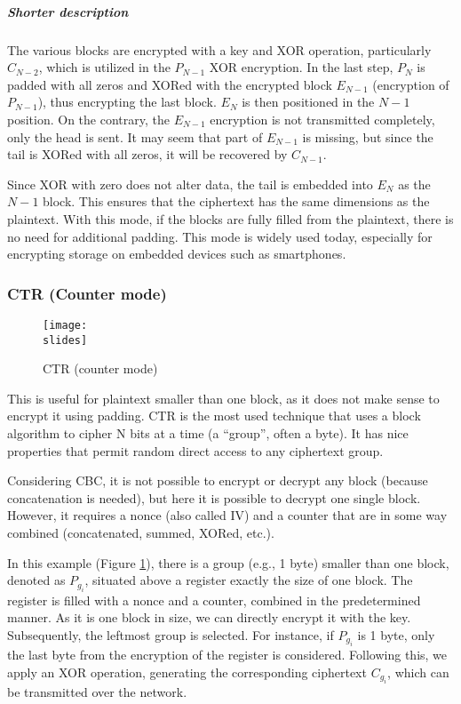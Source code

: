 \subparagraph*{Shorter description}
The various blocks are encrypted with a key and XOR operation, particularly \(C_{N-2}\), which is utilized in the \(P_{N-1}\) XOR encryption.
In the last step, \(P_N\) is padded with all zeros and XORed with the encrypted block \(E_{N-1}\) (encryption of \( P_{N-1} \)), thus encrypting the last block.
\(E_N\) is then positioned in the \(N-1\) position. On the contrary, the \(E_{N-1}\) encryption is not transmitted completely, only the head is sent. It may seem that part of \(E_{N-1}\) is missing, but since the tail is XORed with all zeros, it will be recovered by \(C_{N-1}\).

Since XOR with zero does not alter data, the tail is embedded into \(E_N\) as the \(N-1\) block. This ensures that the ciphertext has the same dimensions as the plaintext. With this mode, if the blocks are fully filled from the plaintext, there is no need for additional padding. This mode is widely used today, especially for encrypting storage on embedded devices such as smartphones.


\subsubsection{CTR (Counter mode)}
\begin{figure}[h]
    \centering
    \texttt{[image: \\slides]}
    \caption{CTR (counter mode)}
    \label{fig:CTR}
\end{figure}

This is useful for plaintext smaller than one block, as it does not make sense to encrypt it using padding. CTR is the most used technique that uses a block algorithm to cipher N bits at a time (a “group”, often a byte). It has nice properties that permit random direct access to any ciphertext group.

Considering CBC, it is not possible to encrypt or decrypt any block (because concatenation is needed), but here it is possible to decrypt one single block. However, it requires a nonce (also called IV) and a counter that are in some way combined (concatenated, summed, XORed, etc.).


In this example (Figure \ref{fig:CTR}), there is a group (e.g., 1 byte) smaller than one block, denoted as $P_{g_i}$, situated above a register exactly the size of one block. 
The register is filled with a nonce and a counter, combined in the predetermined manner.
As it is one block in size, we can directly encrypt it with the key. Subsequently, the leftmost group is selected. For instance, if 
$P_{g_i}$ is 1 byte, only the last byte from the encryption of the register is considered. 
Following this, we apply an XOR operation, generating the corresponding ciphertext $C_{g_i}$, which can be transmitted over the network.


